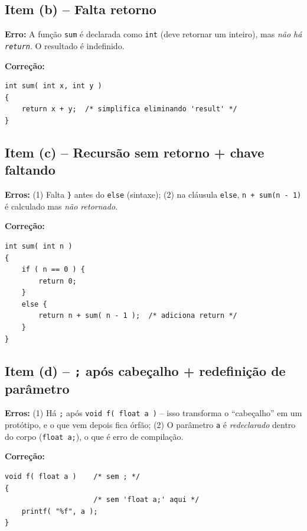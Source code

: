\documentclass[12pt,a4paper]{article}
\begin{document}
\subsection*{Item (b) -- Falta retorno}
\begin{respostabox}
\textbf{Erro:} A função \texttt{sum} é declarada como \texttt{int} (deve retornar
um inteiro), mas \textit{não há \texttt{return}}. O resultado é indefinido.

\textbf{Correção:}
\begin{lstlisting}
int sum( int x, int y )
{
    return x + y;  /* simplifica eliminando 'result' */
}
\end{lstlisting}
\end{respostabox}

\subsection*{Item (c) -- Recursão sem retorno + chave faltando}
\begin{respostabox}
\textbf{Erros:} (1) Falta \texttt{\}} antes do \texttt{else} (sintaxe);
(2) na cláusula \texttt{else}, \texttt{n + sum(n - 1)} é calculado mas \textit{não
retornado}.

\textbf{Correção:}
\begin{lstlisting}
int sum( int n )
{
    if ( n == 0 ) {
        return 0;
    }
    else {
        return n + sum( n - 1 );  /* adiciona return */
    }
}
\end{lstlisting}
\end{respostabox}

\subsection*{Item (d) -- \texttt{;} após cabeçalho + redefinição de parâmetro}
\begin{respostabox}
\textbf{Erros:} (1) Há \texttt{;} após \texttt{void f( float a )} -- isso transforma
o ``cabeçalho'' em um protótipo, e o que vem depois fica órfão; (2) O parâmetro
\texttt{a} é \textit{redeclarado} dentro do corpo (\texttt{float a;}), o que é
erro de compilação.

\textbf{Correção:}
\begin{lstlisting}
void f( float a )    /* sem ; */
{
                     /* sem 'float a;' aqui */
    printf( "%f", a );
}
\end{lstlisting}
\end{respostabox}
\end{document}
